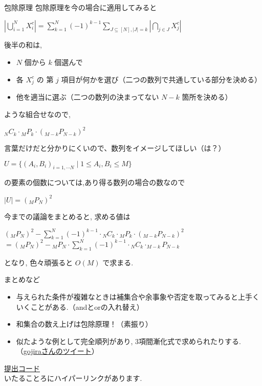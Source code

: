 \documentclass[dvipdfmx,12pt]{beamer}%
\begin{document}
\begin{frame}{包除原理}
包除原理を今の場合に適用してみると
\begin{center}
$ \displaystyle \left|\bigcup_{i=1}^{N} X_i^c\right| =\sum_{k=1}^{N}(-1)^{k-1} \sum_{J \subseteq[N],|J|=k}\left|\bigcap_{j \in J} X_j^c \right| $
\end{center}
後半の和は,
\begin{itemize}
	\item $ N $ 個から $ k $ 個選んで
	\item 各 $ X_j^c $ の 第 $ j $ 項目が何かを選び（二つの数列で共通している部分を決める）
	\item 他を適当に選ぶ（二つの数列の決まってない $ N - k $ 箇所を決める）
\end{itemize} 
ような組合せなので,
\begin{center}
$ {_NC_k} \cdot {_MP_k} \cdot (_{M-k}P_{N-k})^2$
\end{center}
言葉だけだと分かりにくいので、数列をイメージしてほしい（は？）
\end{frame}

\begin{frame}
\begin{center}
$ U =  \{(A_i, B_i)_{i = 1, \cdots N} \mid 1 \leq A_i, B_i \leq M \} $ \\
\end{center}
の要素の個数については,あり得る数列の場合の数なので
\begin{center}
$ \displaystyle \left| U \right| = (_{M}P_{N})^2$
\end{center}
今までの議論をまとめると, 求める値は

\begin{center}
$ \displaystyle (_{M}P_{N})^2 - \sum_{k=1}^N (-1)^{k-1} \cdot {_NC_k} \cdot {_MP_k} \cdot (_{M-k}P_{N-k})^2 $ 
$ = \displaystyle (_{M}P_{N})^2 -  {_MP_N} \cdot \sum_{k=1}^N (-1)^{k-1} \cdot {_NC_k} \cdot _{M-k}P_{N-k}$
\end{center}
となり, 色々頑張ると $O(M)$ で求まる.
\end{frame}

\begin{frame}{まとめなど}
\begin{itemize}
	\item 与えられた条件が複雑なときは補集合や余事象や否定を取ってみると上手くいくことがある.（andとorの入れ替え）
	\item 和集合の数え上げは包除原理！（素振り）
	\item 似たような例として完全順列があり, 3項間漸化式で求められたりする.（\href{https://twitter.com/gojira_kyopro/status/1276879162456698880?s=20}{gojiraさんのツイート}）
\end{itemize}

\href{https://atcoder.jp/contests/abc172/submissions/14888947}{提出コード}\\


いたることろにハイパーリンクがあります.
\end{frame}
%
%
\end{document}
